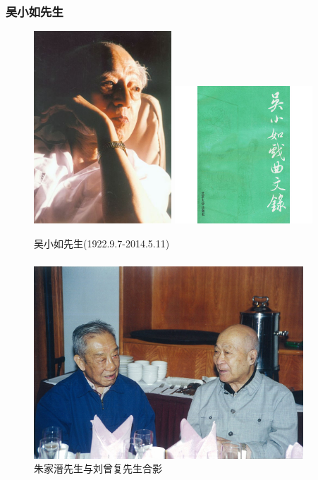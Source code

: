 \documentclass[cjk,slidestop,compress,mathserif,blue]{beamer}
\begin{document}
\frame
{
	\frametitle{吴小如先生}
\begin{figure}[h!]
\centering
\vspace{-0.2in}
\includegraphics[height=0.64\textwidth,width=0.46\textwidth,viewport=0 0 360 520,clip]{Figures/Wu_Xiaoru.jpg}
\hskip 5pt
\includegraphics[height=0.64\textwidth,width=0.46\textwidth,viewport=39 5 200 235,clip]{Figures/Wu_Wenlu.jpg}
\caption{吴小如先生(1922.9.7-2014.5.11)}
\label{Wu_Xiaoru}
\end{figure}
}

\frame
{
	\frametitle{}
\begin{figure}[h!]
\centering
\vspace{-10.5pt}
\includegraphics[height=0.60\textwidth,width=0.9\textwidth,viewport=0 0 510 350,clip]{Figures/Zhu-Liu.jpg}
\caption{\textrm{朱家溍先生与刘曾复先生合影}}
\label{Collect_Wang}
\end{figure}
}
\end{document}
